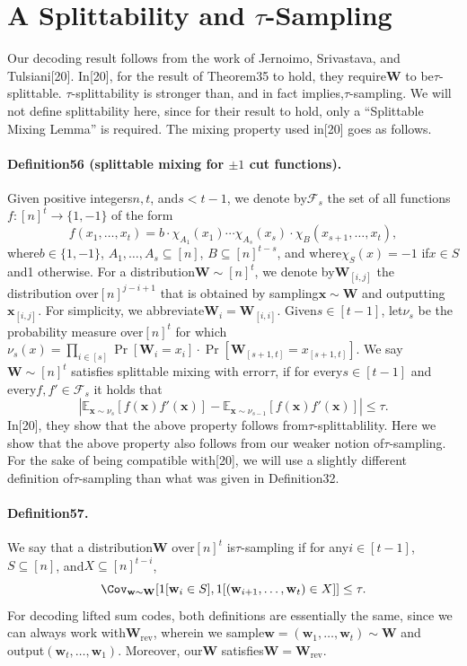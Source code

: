 \section*{A Splittability and $\tau$-Sampling}
Our decoding result follows from the work of Jernoimo, Srivastava, and Tulsiani[20]. In[20], for the result of Theorem35 to hold, they require$\mathbf W$ to be$\tau$-splittable. $\tau$-splittability is stronger than, and in fact implies,$\tau$-sampling. We will not define splittability here, since for their result to hold, only a ``Splittable Mixing Lemma'' is required. The mixing property used in[20] goes as follows.
\paragraph{Definition56 (splittable mixing for $\pm1$ cut functions).} Given positive integers$n,t$, and$s<t-1$, we denote by$\mathcal F_s$ the set of all functions$f:[n]^t\to\{1,-1\}$ of the form
\[f(x_1,\ldots,x_t)=b\cdot\chi_{A_1}(x_1)\cdots\chi_{A_s}(x_s)\cdot\chi_B(x_{s+1},\ldots,x_t),\tag{27}\]
where$b\in\{1,-1\}$, $A_1,\ldots,A_s\subseteq[n]$, $B\subseteq[n]^{t-s}$, and where$\chi_S(x)=-1$ if$x\in S$ and1 otherwise.
For a distribution$\mathbf W\sim[n]^t$, we denote by$\mathbf W_{[i,j]}$ the distribution over$[n]^{j-i+1}$ that is obtained by sampling$\mathbf x\sim\mathbf W$ and outputting$\mathbf x_{[i,j]}$. For simplicity, we abbreviate$\mathbf W_i=\mathbf W_{[i,i]}$. Given$s\in[t-1]$, let$\nu_s$ be the probability measure over$[n]^t$ for which$\nu_s(x)=\prod_{i\in[s]}\Pr[\mathbf W_i=x_i]\cdot\Pr[\mathbf W_{[s+1,t]}=x_{[s+1,t]}]$. We say$\mathbf W\sim[n]^t$ satisfies splittable mixing with error$\tau$, if for every$s\in[t-1]$ and every$f,f'\in\mathcal F_s$ it holds that
\[\left|\mathbb E_{\mathbf x\sim\nu_s}[f(\mathbf x)f'(\mathbf x)]-\mathbb E_{\mathbf x\sim\nu_{s-1}}[f(\mathbf x)f'(\mathbf x)]\right|\leq\tau.\tag{28}\]
In[20], they show that the above property follows from$\tau$-splittablility. Here we show that the above property also follows from our weaker notion of$\tau$-sampling. For the sake of being compatible with[20], we will use a slightly different definition of$\tau$-sampling than what was given in Definition32.
\paragraph{Definition57.} We say that a distribution$\mathbf W$ over$[n]^t$ is$\tau$-sampling if for any$i\in[t-1]$, $S\subseteq[n]$, and$X\subseteq[n]^{t-i}$,
\[\Cov_{\mathbf w\sim\mathbf W}[1[\mathbf w_i\in S],1[(\mathbf w_{i+1},\ldots,\mathbf w_t)\in X]]\leq\tau.\]
For decoding lifted sum codes, both definitions are essentially the same, since we can always work with$\mathbf W_{\mathrm{rev}}$, wherein we sample$\mathbf w=(\mathbf w_1,\ldots,\mathbf w_t)\sim\mathbf W$ and output$(\mathbf w_t,\ldots,\mathbf w_1)$. Moreover, our$\mathbf W$ satisfies$\mathbf W=\mathbf W_{\mathrm{rev}}$.
